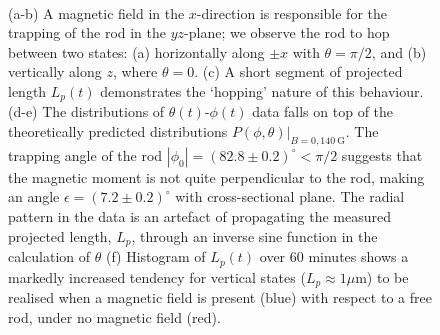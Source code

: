 \documentclass[aps,prl,twocolumn,superscriptaddress]{revtex4-1}
\begin{document}
\begin{figure}
 \\
    \caption{\footnotesize (a-b) A magnetic field in the $x$-direction is responsible for the trapping of the rod in the $yz$-plane; we observe the rod to hop between two states: (a) horizontally along $\pm x$ with $\theta=\pi/2$, and (b) vertically along $z$, where $\theta=0$. (c) A short segment of projected length $L_p(t)$ demonstrates the `hopping' nature of this behaviour. (d-e) The distributions of $\theta(t)$-$\phi(t)$ data falls on top of the theoretically predicted distributions $P(\phi,\theta)|_{B=0,140\ \text{G}}$. The trapping angle of the rod $|\phi_0|=(82.8\pm0.2)^\circ < \pi/2$ suggests that the magnetic moment is not quite perpendicular to the rod, making an angle $\epsilon=(7.2\pm0.2)^\circ$ with cross-sectional plane. The radial pattern in the data is an artefact of propagating the measured projected length, $L_p$, through an inverse sine function in the calculation of $\theta$ (f) Histogram of $L_p(t)$ over 60 minutes shows a markedly increased tendency for vertical states ($L_p \approx 1 \mu$m) to be realised when a magnetic field is present (blue) with respect to a free rod, under no magnetic field (red).}
\end{figure}
\end{document}
